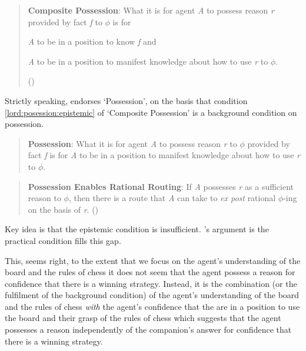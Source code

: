 \documentclass[10pt]{article}
\begin{document}
\begin{quote}
  \textbf{Composite Possession}: What it is for agent \emph{A} to possess reason \emph{r} provided by fact \emph{f} to \(\phi\) is for
  \begin{enumerate*}[label=(\roman*), ref=\roman*.]
  \item\label{lord:posession:epistemic} \emph{A} to be in a position to know \emph{f} and
  \item\label{lord:posession:manifest} \emph{A} to be in a position to manifest knowledge about how to use \emph{r} to \(\phi\).
  \end{enumerate*}
  \nolinebreak
  \mbox{}\hfill\mbox{(\citeyear[123]{Lord:2018aa})}
\end{quote}

Strictly speaking, \citeauthor{Lord:2018aa} endorses `Possession', on the basis that condition \ref{lord:posession:epistemic} of `Composite Possession' is a background condition on possession.

\begin{quote}
  \textbf{Possession}: What it is for agent \emph{A} to possess reason \emph{r} to \(\phi\) provided by fact \emph{f} is for \emph{A} to be in a position to manifest knowledge about how to use \emph{r} to \(\phi\).
\end{quote}

\begin{quote}
  \textbf{Possession Enables Rational Routing}: If \emph{A} possesses \emph{r} as a sufficient reason to \(\phi\), then there is a route that \emph{A} can take to \emph{ex post} rational \(\phi\)-ing on the basis of \emph{r}.\nolinebreak
  \mbox{}\hfill\mbox{(\citeyear[100]{Lord:2018aa})}
\end{quote}

Key idea is that the epistemic condition is insufficient.
\citeauthor{Lord:2018aa}'s argument is the practical condition fills this gap.

This, seems right, to the extent that we focus on the agent's understanding of the board and the rules of chess it does not seem that the agent possess a reason for confidence that there is a winning strategy.
Instead, it is the combination (or the fulfilment of the background condition) of the agent's understanding of the board and the rules of chess \emph{with} the agent's confidence that the are in a position to use the board and their grasp of the rules of chess which suggests that the agent possesses a reason independently of the companion's answer for confidence that there is a winning strategy.
\end{document}
